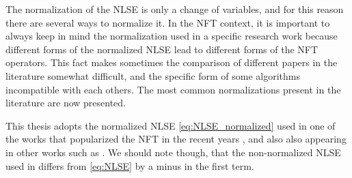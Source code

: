The normalization of the \ac{NLSE} is only a change of variables, and for this
reason there are several ways to normalize it.
In the \ac{NFT} context, it is important to always keep in mind the normalization
used in a specific research work because different forms of the normalized
\ac{NLSE} lead to different forms of the \ac{NFT} operators. This fact makes
sometimes the comparison of different papers in the literature somewhat
difficult, and the specific form of some algorithms incompatible with each
others. The most common normalizations present in the literature are now presented.

This thesis adopts the normalized \ac{NLSE} \eqref{eq:NLSE_normalized} used in one of the works that popularized the \ac{NFT} in the recent years
\cite{Yousefi2014}, and also also appearing in other works such as
\cite{Ablowitz2004a,Docksey2000a,hari2016multieigenvalue,
tavakkolnia2015signalling}. We should note though, that the non-normalized \ac{NLSE} used
in \cite{Yousefi2014} differs from \eqref{eq:NLSE} by a minus in the first term.



